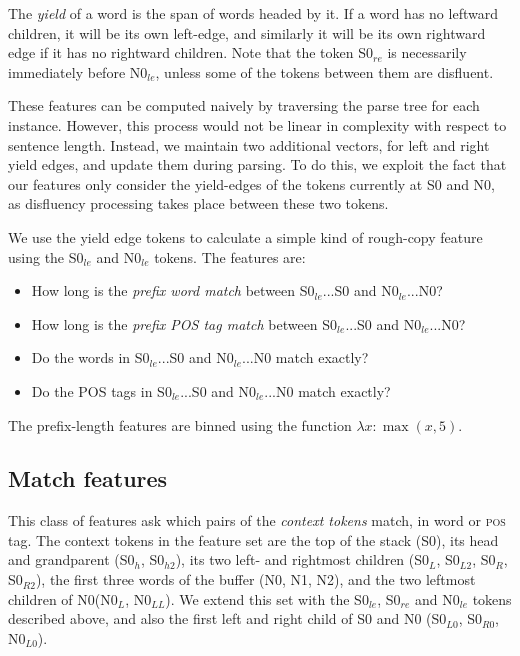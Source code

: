 \documentclass[11pt,letterpaper]{article}
\newcommand{\pos}{\textsc{pos}\xspace}
\newcommand{\szero}{S0\xspace}
\newcommand{\nzero}{N0\xspace}
\newcommand{\szeroH}{S0$_h$\xspace}
\newcommand{\szeroHH}{S0$_{h2}$\xspace}
\newcommand{\szeroL}{S0$_L$\xspace}
\newcommand{\szeroLL}{S0$_{L2}$\xspace}
\newcommand{\szeroR}{S0$_R$\xspace}
\newcommand{\szeroRR}{S0$_{R2}$\xspace}
\newcommand{\szeroLzero}{S0$_{L0}$\xspace}
\newcommand{\szeroRzero}{S0$_{R0}$\xspace}
\newcommand{\nzeroL}{N0$_L$\xspace}
\newcommand{\nzeroLL}{N0$_{LL}$\xspace}
\newcommand{\nzeroLzero}{N0$_{L0}$\xspace}
\newcommand{\szeroRedge}{S0$_{re}$\xspace}
\newcommand{\szeroLedge}{S0$_{le}$\xspace}
\newcommand{\nzeroLedge}{N0$_{le}$\xspace}
\begin{document}
The \emph{yield} of a word is the span of words headed by it.  If a word has
no leftward children, it will be its own left-edge, and similarly it will be
its own rightward edge if it has no rightward children. Note that the token
\szeroRedge is necessarily immediately before \nzeroLedge, unless some of the
tokens between them are disfluent.

These features can be computed naively by traversing the parse tree for each
instance. However, this process would not be linear in complexity with respect
to sentence length.  Instead, we maintain two additional vectors, for left
and right yield edges, and update them during parsing.  To do this, we exploit
the fact that our features only consider the yield-edges of the tokens currently
at S0 and N0, as disfluency processing takes place between these two tokens.

We use the yield edge tokens to calculate a simple kind of rough-copy feature
using the \szeroLedge and \nzeroLedge tokens.  The features are:

\begin{itemize}
    \itemsep0em
    \item How long is the \emph{prefix word match} between \szeroLedge...\szero
          and \nzeroLedge...\nzero?
    \item How long is the \emph{prefix POS tag match} between \szeroLedge...\szero
          and \nzeroLedge...\nzero?
    \item Do the words in \szeroLedge...\szero and \nzeroLedge...\nzero match
          exactly?
    \item Do the POS tags in \szeroLedge...\szero and \nzeroLedge...\nzero match
          exactly?
\end{itemize}

The prefix-length features are binned using the function $\lambda x: \max(x, 5)$.

\subsection{Match features}

This class of features ask which pairs of the \emph{context tokens} match, in
word or \pos tag.  The context tokens in the \citet{zhang:11} feature set
are the top of the stack (\szero), its head and grandparent (\szeroH, \szeroHH),
its two left- and rightmost children (\szeroL, \szeroLL, \szeroR, \szeroRR), the
first three words of the buffer (\nzero, N1, N2), and the two leftmost children
of \nzero (\nzeroL, \nzeroLL).
We extend this set with the \szeroLedge, \szeroRedge and \nzeroLedge tokens
described above, and also the first left and right child of \szero and \nzero
(\szeroLzero, \szeroRzero, \nzeroLzero).
\end{document}
